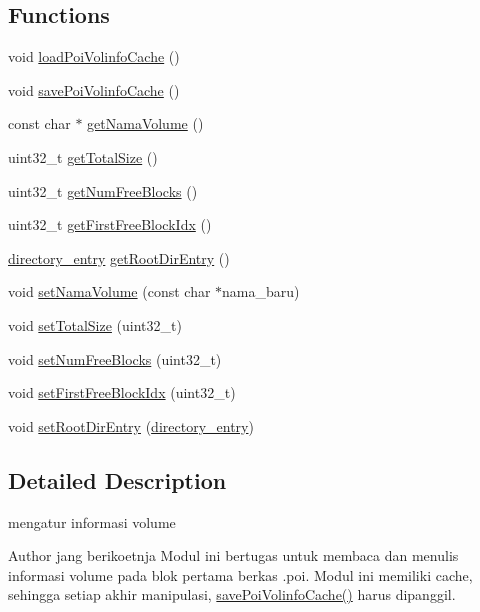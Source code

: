 \subsection*{Functions}
\begin{DoxyCompactItemize}
\item 
void \hyperlink{volume-information_8h_af6d08c2f02ba561e21c8aeef199e20f2}{load\-Poi\-Volinfo\-Cache} ()
\item 
void \hyperlink{volume-information_8h_a1411a8d39fd2b72db7e153f715662214}{save\-Poi\-Volinfo\-Cache} ()
\item 
const char $\ast$ \hyperlink{volume-information_8h_aedec943e322464900a140b69fa2e284b}{get\-Nama\-Volume} ()
\item 
uint32\-\_\-t \hyperlink{volume-information_8h_abd30ee89eb14436746e6a963c90cd1a4}{get\-Total\-Size} ()
\item 
uint32\-\_\-t \hyperlink{volume-information_8h_ae397a4a9fdd9cc21529262cfe1597e50}{get\-Num\-Free\-Blocks} ()
\item 
uint32\-\_\-t \hyperlink{volume-information_8h_aff9dadb573d07c60c0281c3441ba3881}{get\-First\-Free\-Block\-Idx} ()
\item 
\hyperlink{structdirectory__entry}{directory\-\_\-entry} \hyperlink{volume-information_8h_a32c12de0ce0f231386676aca679e459e}{get\-Root\-Dir\-Entry} ()
\item 
void \hyperlink{volume-information_8h_afb97ee78665af0ad59773de9169b8d0a}{set\-Nama\-Volume} (const char $\ast$nama\-\_\-baru)
\item 
void \hyperlink{volume-information_8h_a6a0ecaeeea8bd2cbfc8c261d9c53d912}{set\-Total\-Size} (uint32\-\_\-t)
\item 
void \hyperlink{volume-information_8h_a3cd233d6e37f47da727985bf59d25578}{set\-Num\-Free\-Blocks} (uint32\-\_\-t)
\item 
void \hyperlink{volume-information_8h_ac32f884b498264f15c77ee76f1a7ca1a}{set\-First\-Free\-Block\-Idx} (uint32\-\_\-t)
\item 
void \hyperlink{volume-information_8h_abe16a34b4a6eacd75710b3b619c84779}{set\-Root\-Dir\-Entry} (\hyperlink{structdirectory__entry}{directory\-\_\-entry})
\end{DoxyCompactItemize}


\subsection{Detailed Description}
mengatur informasi volume \begin{DoxyAuthor}{Author}
jang berikoetnja Modul ini bertugas untuk membaca dan menulis informasi volume pada blok pertama berkas .poi. Modul ini memiliki cache, sehingga setiap akhir manipulasi, \hyperlink{volume-information_8c_a1411a8d39fd2b72db7e153f715662214}{save\-Poi\-Volinfo\-Cache()} harus dipanggil. 
\end{DoxyAuthor}


